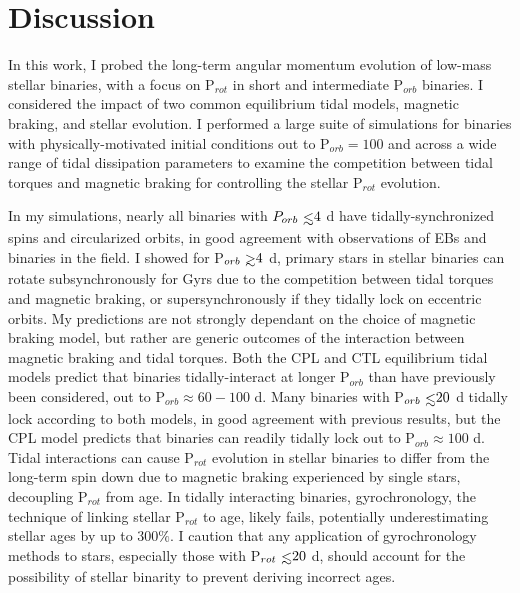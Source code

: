 
\section{Discussion} \label{sync:sec:discussion}

In this work, I probed the long-term angular momentum evolution of low-mass stellar binaries, with a focus on P$_{rot}$ in short and intermediate P$_{orb}$ binaries.  I considered the impact of two common equilibrium tidal models, magnetic braking, and stellar evolution.  I performed a large suite of simulations for binaries with physically-motivated initial conditions out to P$_{orb} = 100$ and across a wide range of tidal dissipation parameters to examine the competition between tidal torques and magnetic braking for controlling the stellar P$_{rot}$ evolution. 

In my simulations, nearly all binaries with $P_{orb} \lsim 4$ d have tidally-synchronized spins and circularized orbits, in good agreement with observations of \kepler EBs and binaries in the field. I showed for P$_{orb} \gsim 4$ d, primary stars in stellar binaries can rotate subsynchronously for Gyrs due to the competition between tidal torques and magnetic braking, or supersynchronously if they tidally lock on eccentric orbits. My predictions are not strongly dependant on the choice of magnetic braking model, but rather are generic outcomes of the interaction between magnetic braking and tidal torques.  Both the CPL and CTL equilibrium tidal models predict that binaries tidally-interact at longer P$_{orb}$ than have previously been considered, out to P$_{orb} \approx 60-100$ d. Many binaries with P$_{orb} \lsim 20$ d tidally lock according to both models, in good agreement with previous results, but the CPL model predicts that binaries can readily tidally lock out to P$_{orb} \approx 100$ d. Tidal interactions can cause P$_{rot}$ evolution in stellar binaries to differ from the long-term spin down due to magnetic braking experienced by single stars, decoupling P$_{rot}$ from age.  In tidally interacting binaries, gyrochronology, the technique of linking stellar P$_{rot}$ to age, likely fails, potentially underestimating stellar ages by up to $300\%$. I caution that any application of gyrochronology methods to stars, especially those with P$_{rot} \lsim 20$ d, should account for the possibility of stellar binarity to prevent deriving incorrect ages. 

